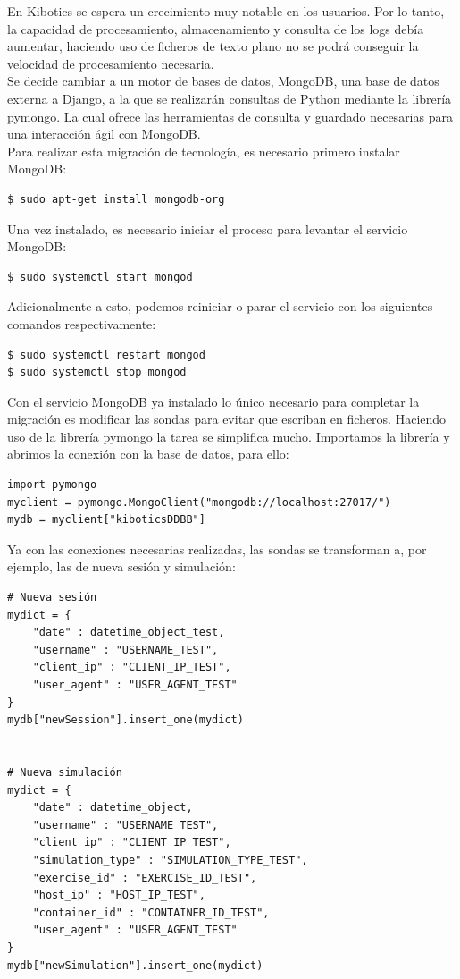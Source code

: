 \documentclass[11pt,a4paper]{book}
\begin{document}
			En Kibotics se espera un crecimiento muy notable en los usuarios. Por lo tanto, la capacidad de procesamiento, almacenamiento y consulta de los logs debía aumentar, haciendo uso de ficheros de texto plano no se podrá conseguir la velocidad de procesamiento necesaria. \\
			Se decide cambiar a un motor de bases de datos, MongoDB, una base de datos externa a Django, a la que se realizarán consultas de Python mediante la librería pymongo. La cual ofrece las herramientas de consulta y guardado necesarias para una interacción ágil con MongoDB.\\
			
			Para realizar esta migración de tecnología, es necesario primero instalar MongoDB:
			
			\begin{Verbatim}[tabsize=4]
$ sudo apt-get install mongodb-org
			\end{Verbatim}

			
			Una vez instalado, es necesario iniciar el proceso para levantar el servicio MongoDB:
			
			\begin{Verbatim}[tabsize=4]
$ sudo systemctl start mongod
			\end{Verbatim}
			
			Adicionalmente a esto, podemos reiniciar o parar el servicio con los siguientes comandos respectivamente:
			
			\begin{Verbatim}[tabsize=4]
$ sudo systemctl restart mongod
$ sudo systemctl stop mongod
			\end{Verbatim}
			
			Con el servicio MongoDB ya instalado lo único necesario para completar la migración es modificar las sondas para evitar que escriban en ficheros. Haciendo uso de la librería pymongo la tarea se simplifica mucho.
			Importamos la librería y abrimos la conexión con la base de datos, para ello: 
			
			\begin{Verbatim}[tabsize=4]
import pymongo
myclient = pymongo.MongoClient("mongodb://localhost:27017/")
mydb = myclient["kiboticsDDBB"]
			\end{Verbatim}
			
			Ya con las conexiones necesarias realizadas, las sondas se transforman a, por ejemplo, las de nueva sesión y simulación:
			\begin{Verbatim}[tabsize=4]
# Nueva sesión
mydict = {
	"date" : datetime_object_test, 
	"username" : "USERNAME_TEST", 
	"client_ip" : "CLIENT_IP_TEST", 
	"user_agent" : "USER_AGENT_TEST"
}
mydb["newSession"].insert_one(mydict)


# Nueva simulación
mydict = {
	"date" : datetime_object, 
	"username" : "USERNAME_TEST", 
	"client_ip" : "CLIENT_IP_TEST", 
	"simulation_type" : "SIMULATION_TYPE_TEST",
	"exercise_id" : "EXERCISE_ID_TEST",
	"host_ip" : "HOST_IP_TEST",
	"container_id" : "CONTAINER_ID_TEST",
	"user_agent" : "USER_AGENT_TEST"
}
mydb["newSimulation"].insert_one(mydict)
			\end{Verbatim}
\end{document}
